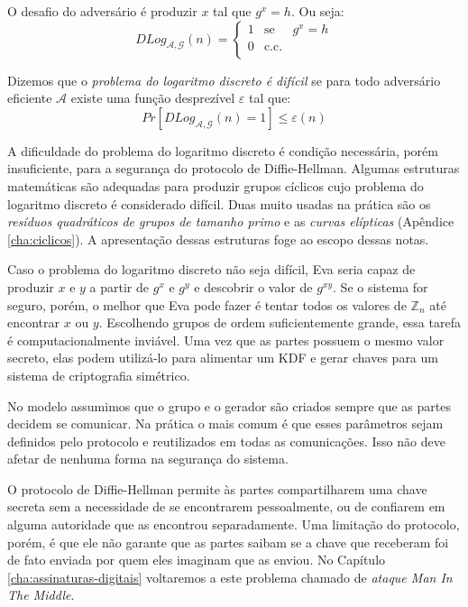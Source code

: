 O desafio do adversário é produzir $x$ tal que $g^x = h$.
Ou seja:
\begin{displaymath}
  DLog_{\mathcal{A}, \mathcal{G}}(n) = \left\{
    \begin{array}{lcl}
      1 & \textrm{se} & g^x = h\\
      0 & \textrm{c.c.} &\\
    \end{array}
    \right.
\end{displaymath}

Dizemos que o {\em problema do logaritmo discreto é difícil} se para todo adversário eficiente $\mathcal{A}$ existe uma função desprezível $\varepsilon$ tal que:
\begin{displaymath}
  Pr[DLog_{\mathcal{A}, \mathcal{G}}(n) = 1] \leq \varepsilon(n)
\end{displaymath}

A dificuldade do problema do logaritmo discreto é condição necessária, porém insuficiente, para a segurança do protocolo de Diffie-Hellman.
Algumas estruturas matemáticas são adequadas para produzir grupos cíclicos cujo problema do logaritmo discreto é considerado difícil.
Duas muito usadas na prática são os {\em resíduos quadráticos de grupos de tamanho primo} e as {\em curvas elípticas} (Apêndice \ref{cha:ciclicos}).
A apresentação dessas estruturas foge ao escopo dessas notas.


Caso o problema do logaritmo discreto não seja difícil, Eva seria capaz de produzir $x$ e $y$ a partir de $g^x$ e $g^y$ e descobrir o valor de $g^{xy}$.
Se o sistema for seguro, porém, o melhor que Eva pode fazer é tentar todos os valores de $\mathbb{Z}_n$ até encontrar $x$ ou $y$.
Escolhendo grupos de ordem suficientemente grande, essa tarefa é computacionalmente inviável.
Uma vez que as partes possuem o mesmo valor secreto, elas podem utilizá-lo para alimentar um KDF e gerar chaves para um sistema de criptografia simétrico.

No modelo assumimos que o grupo e o gerador são criados sempre que as partes decidem se comunicar.
Na prática o mais comum é que esses parâmetros sejam definidos pelo protocolo e reutilizados em todas as comunicações.
Isso não deve afetar de nenhuma forma na segurança do sistema.

O protocolo de Diffie-Hellman permite às partes compartilharem uma chave secreta sem a necessidade de se encontrarem pessoalmente, ou de confiarem em alguma autoridade que as encontrou separadamente.
Uma limitação do protocolo, porém, é que ele não garante que as partes saibam se a chave que receberam foi de fato enviada por quem eles imaginam que as enviou.
No Capítulo \ref{cha:assinaturas-digitais} voltaremos a este problema chamado de {\em ataque Man In The Middle}.


